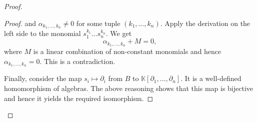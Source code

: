\documentclass[a4paper,draft,reqno,12pt]{amsart}
\theoremstyle{definition}
\theoremstyle{definition}
\theoremstyle{remark}
\def\BK{{\mathbb K}}
\def\BK{{\mathbb K}}
\begin{document}
\begin{proof}
\begin{proof}
        and $\alpha_{k_1,\dotsc,k_n}\neq0$ for some tuple $(k_1,\dotsc,k_n)$. Apply the derivation on the left side to the monomial $s_1^{k_1}\dotsc s_n^{k_n}$. We get \begin{equation*}
            \alpha_{k_1,\dotsc,k_n}+M = 0,
        \end{equation*} where $M$ is a linear combination of non-constant monomials and hence $\alpha_{k_1,\dotsc,k_n}=0$. This is a contradiction.

        Finally, consider the map $s_i\mapsto\partial_i$ from $B$ to $\BK[\partial_1,\dotsc,\partial_n]$. It is a well-defined homomorphism of algebras. The above reasoning shows that this map is bijective and hence it yields the required isomorphism.
    \end{proof}
\end{proof}
\end{document}
